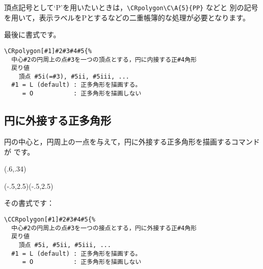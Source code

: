 \documentclass[a4j]{jarticle}
\begin{document}
頂点記号として`P'を用いたいときは，\verb/\CRpolygon\C\A{5}{PP}/ などと
別の記号を用いて，表示ラベルをPとするなどの二重帳簿的な処理が必要となります。

最後に書式です。

\begin{boxnote}
\begin{verbatim}
\CRpolygon[#1]#2#3#4#5{%
  中心#2の円周上の点#3を一つの頂点とする，円に内接する正#4角形
  戻り値
    頂点 #5i(=#3), #5ii, #5iii, ...
  #1 = L (default) : 正多角形を描画する。
     = O           : 正多角形を描画しない
\end{verbatim}
\end{boxnote}
\clearpage

\subsection{円に外接する正多角形}
円の中心と，円周上の一点を与えて，円に外接する正多角形を描画するコマンドが
です。

\begin{showEx}(.6,.34){}
\begin{zahyou}[ul=10mm](-.5,2.5)(-.5,2.5)
  \kuromaru{\C;\T}
  \CCRpolygon\C{}
  \En{}
\end{zahyou}
\end{showEx}

その書式です：

\begin{boxnote}
\begin{verbatim}
\CCRpolygon[#1]#2#3#4#5{%
  中心#2の円周上の点#3を一つの接点とする，円に外接する正#4角形
  戻り値
    頂点 #5i, #5ii, #5iii, ...
  #1 = L (default) : 正多角形を描画する。
     = O           : 正多角形を描画しない
\end{verbatim}
\end{boxnote}
\end{document}
